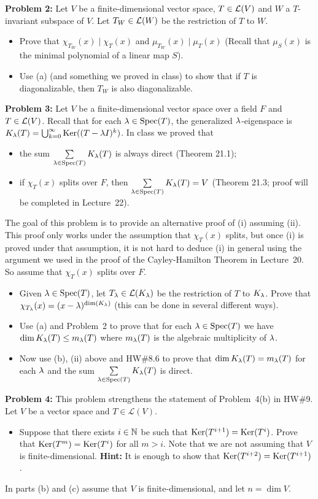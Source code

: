 \documentclass[11pt]{amsart}
\begin{document}
{\bf Problem 2:} Let $V$ be a finite-dimensional vector space, $T\in{\mathcal L}(V)$ and $W$ a $T$-invariant subspace of $V$.
Let $T_W\in {\mathcal L}(W)$ be the restriction of $T$ to $W$.
\begin{itemize}
\item[(a)] Prove that $\chi_{T_W}(x)\mid \chi_{T}(x)$ and $\mu_{T_W}(x)\mid \mu_T(x)$ (Recall that $\mu_S(x)$ is the minimal polynomial
of a linear map $S$).
\item[(b)] Use (a) (and something we proved in class) to show that if $T$ is diagonalizable, then $T_{W}$ is also diagonalizable.
\end{itemize}
\skv
{\bf Problem 3:} Let $V$ be a finite-dimensional vector space over a field $F$ and $T\in{\mathcal L}(V)$. Recall that for each ${\lambda}\in {\rm Spec}(T)$,
the generalized ${\lambda}$-eigenspace is $K_{{\lambda}}(T)=\bigcup_{k=0}^{\infty}{\rm Ker}((T-{\lambda} I)^k)$. In class we proved that
\begin{itemize}
\item[(i)] the sum $\sum\limits_{{\lambda}\in{\rm Spec}(T)}K_{{\lambda}}(T)$ is always direct (Theorem 21.1);
\item[(ii)] if $\chi_T(x)$ splits over $F$, then $\sum\limits_{{\lambda}\in{\rm Spec}(T)}K_{{\lambda}}(T)=V$ (Theorem 21.3; proof will be completed in
Lecture~22).
\end{itemize}
The goal of this problem is to provide an alternative proof of (i) assuming (ii). This proof only works under the assumption that 
$\chi_T(x)$ splits, but once (i) is proved under that assumption, it is not hard to deduce (i) in general using the argument we used
in the proof of the Cayley-Hamilton Theorem in Lecture~20.
\skv
So assume that $\chi_T(x)$ splits over $F$.
\begin{itemize}
\item[(a)] Given ${\lambda}\in {\rm Spec}(T)$, let $T_{{\lambda}}\in {\mathcal L}(K_{{\lambda}})$ be the restriction of $T$ to $K_{{\lambda}}$. Prove that
$\chi_{T_{{\lambda}}}(x)=(x-{\lambda})^{\dim(K_{{\lambda}})}$ (this can be done in several different ways).
\item[(b)] Use (a) and Problem~2 to prove that for each ${\lambda}\in{\rm Spec}(T)$ we have $\dim K_{{\lambda}}(T)\leq m_{{\lambda}}(T)$
where $m_{{\lambda}}(T)$ is the algebraic multiplicity of ${\lambda}$.
\item[(c)] Now use (b), (ii) above and HW\#8.6 to prove that $\dim K_{{\lambda}}(T) = m_{{\lambda}}(T)$ for each ${\lambda}$ and the sum $\sum\limits_{{\lambda}\in{\rm Spec}(T)}K_{{\lambda}}(T)$ is direct.
 \end{itemize}
\skv
{\bf Problem 4:} This problem strengthens the statement of 
Problem~4(b) in HW\#9. Let $V$ be a vector space and
$T\in \mathcal L (V)$.
\begin{itemize}
\item[(a)] Suppose that there exists $i\in{\mathbb N}$ be such that ${\rm Ker}(T^{i+1})={\rm Ker}(T^{i})$. Prove that
${\rm Ker}(T^{m})={\rm Ker}(T^{i})$ for all $m>i$.  Note that we are not assuming that $V$ is finite-dimensional.
{\bf Hint:} It is enough to show
that ${\rm Ker}(T^{i+2})={\rm Ker}(T^{i+1})$.
\end{itemize}
In parts (b) and (c)  assume that $V$ is finite-dimensional, and let $n=\dim V$.
\end{document}
